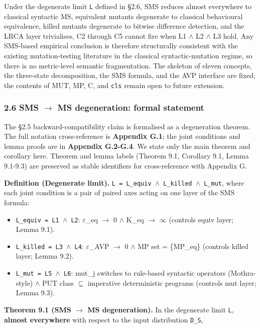 \documentclass[review,12pt,authoryear]{elsarticle}
\providecommand{\tightlist}{\setlength{\itemsep}{0pt}\setlength{\parskip}{0pt}}
\begin{document}
Under the degenerate limit \texttt{L} defined in §2.6, SMS reduces
almost everywhere to classical syntactic MS, equivalent mutants
degenerate to classical behavioural equivalence, killed mutants
degenerate to bitwise difference detection, and the LRCA layer
trivialises, C2 through C5 cannot fire when L1 $\wedge$ L2 $\wedge$ L3 hold. Any
SMS-based empirical conclusion is therefore structurally consistent with
the existing mutation-testing literature in the classical
syntactic-mutation regime, so there is no metric-level semantic
fragmentation. The skeleton of eleven concepts, the three-state
decomposition, the SMS formula, and the AVP interface are fixed; the
contents of MUT, MP, C, and \texttt{cls} remain open to future
extension.

\subsubsection{2.6 SMS $\to$ MS degeneration: formal
statement}\label{sms-ms-degeneration-formal-statement}

The §2.5 backward-compatibility claim is formalised as a degeneration
theorem. The full notation cross-reference is \textbf{Appendix G.1}; the
joint conditions and lemma proofs are in \textbf{Appendix G.2-G.4}. We
state only the main theorem and corollary here. Theorem and lemma labels
(Theorem 9.1, Corollary 9.1, Lemma 9.1-9.3) are preserved as stable
identifiers for cross-reference with Appendix G.

\textbf{Definition (Degenerate limit).}
\texttt{L\ =\ L\_equiv\ $\wedge$\ L\_killed\ $\wedge$\ L\_mut}, where each joint
condition is a pair of paired axes acting on one layer of the SMS
formula:

\begin{itemize}
\tightlist
\item
  \texttt{L\_equiv\ =\ L1\ $\wedge$\ L2}: $\varepsilon$\_eq $\to$ 0 $\wedge$ K\_eq $\to$ $\infty$ (controls equiv
  layer; Lemma 9.1).
\item
  \texttt{L\_killed\ =\ L3\ $\wedge$\ L4}: $\varepsilon$\_AVP $\to$ 0 $\wedge$ MP set = \{MP\_eq\}
  (controls killed layer; Lemma 9.2).
\item
  \texttt{L\_mut\ =\ L5\ $\wedge$\ L6}: mut\_j switches to rule-based syntactic
  operators (Mothra-style) $\wedge$ PUT class $\subseteq$ imperative deterministic
  programs (controls mut layer; Lemma 9.3).
\end{itemize}

\textbf{Theorem 9.1 (SMS $\to$ MS degeneration).} In the degenerate limit
\texttt{L}, \textbf{almost everywhere} with respect to the input
distribution \texttt{D\_S},
\end{document}
